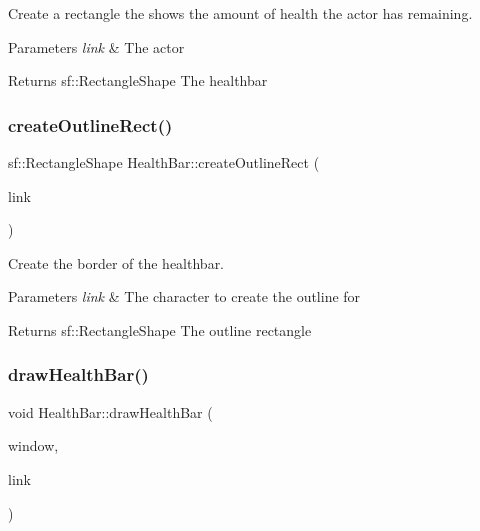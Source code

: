 Create a rectangle the shows the amount of health the actor has remaining. 


\begin{DoxyParams}{Parameters}
{\em link} & The actor \\
\hline
\end{DoxyParams}
\begin{DoxyReturn}{Returns}
sf\+::\+Rectangle\+Shape The healthbar 
\end{DoxyReturn}
\mbox{\label{classHealthBar_a79b4a771bcf2dcea3723089e075451d0}} 
\subsubsection{\texorpdfstring{createOutlineRect()}{createOutlineRect()}}
{\footnotesize\ttfamily sf\+::\+Rectangle\+Shape Health\+Bar\+::create\+Outline\+Rect (\begin{DoxyParamCaption}\item[{\mbox{\hyperlink{classRose_1_1Character_1_1Actor}{Rose\+::\+Character\+::\+Actor}} \&}]{link }\end{DoxyParamCaption})}



Create the border of the healthbar. 


\begin{DoxyParams}{Parameters}
{\em link} & The character to create the outline for\\
\hline
\end{DoxyParams}
\begin{DoxyReturn}{Returns}
sf\+::\+Rectangle\+Shape The outline rectangle 
\end{DoxyReturn}
\mbox{\label{classHealthBar_a698ad26d6a842a1365bf7655a7e69def}} 
\subsubsection{\texorpdfstring{drawHealthBar()}{drawHealthBar()}}
{\footnotesize\ttfamily void Health\+Bar\+::draw\+Health\+Bar (\begin{DoxyParamCaption}\item[{sf\+::\+Render\+Window \&}]{window,  }\item[{\mbox{\hyperlink{classRose_1_1Character_1_1Actor}{Rose\+::\+Character\+::\+Actor}} \&}]{link }\end{DoxyParamCaption})}




